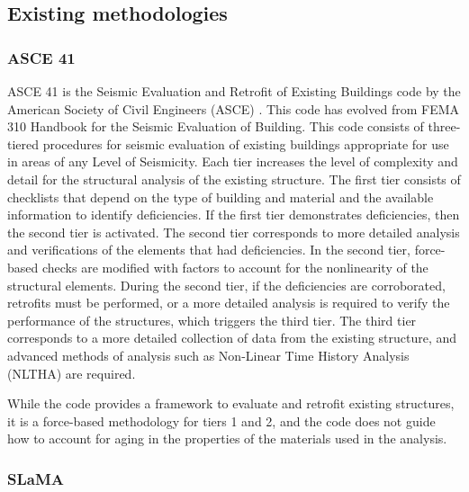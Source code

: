\subsection{Existing methodologies}

\subsubsection{ASCE 41}

ASCE 41 is the Seismic Evaluation and Retrofit of Existing Buildings code by the American Society of Civil Engineers (ASCE) \cite{ASCE-41-2017}. This code has evolved from FEMA 310 Handbook for the Seismic Evaluation of Building. This code consists of three-tiered procedures for seismic evaluation of existing buildings appropriate for use in areas of any Level of Seismicity. Each tier increases the level of complexity and detail for the structural analysis of the existing structure. The first tier consists of checklists that depend on the type of building and material and the available information to identify deficiencies. If the first tier demonstrates deficiencies, then the second tier is activated. The second tier corresponds to more detailed analysis and verifications of the elements that had deficiencies. In the second tier, force-based checks are modified with factors to account for the nonlinearity of the structural elements. During the second tier, if the deficiencies are corroborated, retrofits must be performed, or a more detailed analysis is required to verify the performance of the structures, which triggers the third tier. The third tier corresponds to a more detailed collection of data from the existing structure, and advanced methods of analysis such as Non-Linear Time History Analysis (NLTHA) are required.

While the code provides a framework to evaluate and retrofit existing structures, it is a force-based methodology for tiers 1 and 2, and the code does not guide how to account for aging in the properties of the materials used in the analysis. 

\subsubsection{SLaMA}

